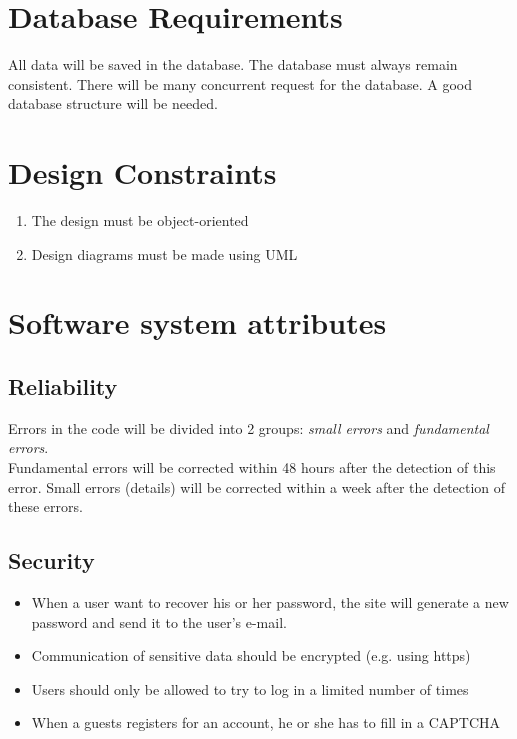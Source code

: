 \section{Database Requirements}
	All data will be saved in the database. The database must always remain consistent. There will be many concurrent request 
	for the database. A good database structure will be needed. 
\section{Design Constraints}
	\begin{enumerate}
		\item The design must be object-oriented
		\item Design diagrams must be made using UML
	\end{enumerate}
\section{Software system attributes}
	\subsection{Reliability}
		Errors in the code will be divided into 2 groups: \textit{small errors} and \textit{fundamental errors}. \\ 
		Fundamental errors will be corrected within 48 hours after the detection of this error. Small errors (details) will be corrected within a week after the detection of these errors. 
	\subsection{Security}
		\begin{itemize}
			\item When a user want to recover his or her password, the site will generate a new password and send it to the user's e-mail.
			\item Communication of sensitive data should be encrypted (e.g. using https)
			\item Users should only be allowed to try to log in a limited number of times
			\item When a guests registers for an account, he or she has to fill in a CAPTCHA
		\end{itemize}
